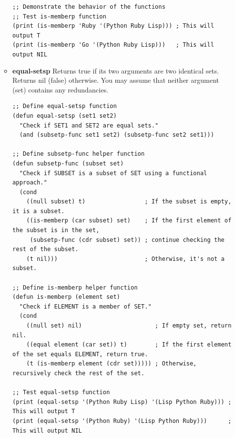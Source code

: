 \documentclass[12pt]{article}
\begin{document}
\begin{spacing}{1.5}
\begin{enumerate}
\begin{itemize}
\begin{lstlisting}
;; Demonstrate the behavior of the functions
;; Test is-memberp function
(print (is-memberp 'Ruby '(Python Ruby Lisp))) ; This will output T
(print (is-memberp 'Go '(Python Ruby Lisp)))   ; This will output NIL
		      	      \end{lstlisting}
		      	      		      	      		      	      		      	      
		      	      		      	      		      	      		      	      
		      	      		      	      		      	      		      	                      
		      	\item \textbf{equal-setsp} Returns true if its two arguments are two identical sets. Returns nil (false) otherwise. You may assume that neither argument (set) contains any redundancies.
		      	      		      	      		      	      		      	      
		      	      \begin{lstlisting}
;; Define equal-setsp function
(defun equal-setsp (set1 set2)
  "Check if SET1 and SET2 are equal sets."
  (and (subsetp-func set1 set2) (subsetp-func set2 set1)))

;; Define subsetp-func helper function
(defun subsetp-func (subset set)
  "Check if SUBSET is a subset of SET using a functional approach."
  (cond
    ((null subset) t)                 ; If the subset is empty, it is a subset.
    ((is-memberp (car subset) set)    ; If the first element of the subset is in the set,
     (subsetp-func (cdr subset) set)) ; continue checking the rest of the subset.
    (t nil)))                         ; Otherwise, it's not a subset.

;; Define is-memberp helper function
(defun is-memberp (element set)
  "Check if ELEMENT is a member of SET."
  (cond
    ((null set) nil)                     ; If empty set, return nil.
    ((equal element (car set)) t)        ; If the first element of the set equals ELEMENT, return true.
    (t (is-memberp element (cdr set))))) ; Otherwise, recursively check the rest of the set.

;; Test equal-setsp function
(print (equal-setsp '(Python Ruby Lisp) '(Lisp Python Ruby))) ; This will output T
(print (equal-setsp '(Python Ruby) '(Lisp Python Ruby)))      ; This will output NIL
		      	      \end{lstlisting}
		      	      		      	      		      	      		      	                      
		      \end{itemize}
		      		      		      		                  

\end{enumerate}
\end{spacing}
\end{document}
